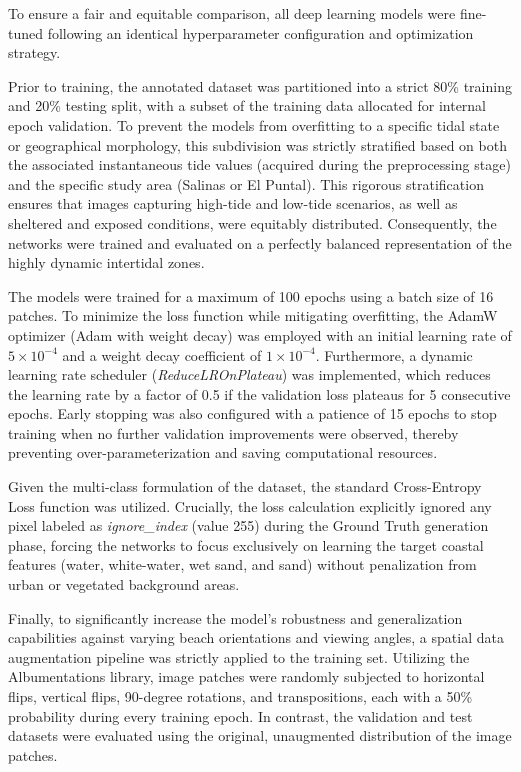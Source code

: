 ﻿\documentclass[ENG]{TFUOC}%
\begin{document}
To ensure a fair and equitable comparison, all deep learning models were fine-tuned following an identical hyperparameter configuration and optimization strategy. 

Prior to training, the annotated dataset was partitioned into a strict 80\% training and 20\% testing split, with a subset of the training data allocated for internal epoch validation. To prevent the models from overfitting to a specific tidal state or geographical morphology, this subdivision was strictly stratified based on both the associated instantaneous tide values (acquired during the preprocessing stage) and the specific study area (Salinas or El Puntal). This rigorous stratification ensures that images capturing high-tide and low-tide scenarios, as well as sheltered and exposed conditions, were equitably distributed. Consequently, the networks were trained and evaluated on a perfectly balanced representation of the highly dynamic intertidal zones.

The models were trained for a maximum of 100 epochs using a batch size of 16 patches. To minimize the loss function while mitigating overfitting, the AdamW optimizer (Adam with weight decay) was employed with an initial learning rate of $5 \times 10^{-4}$ and a weight decay coefficient of $1 \times 10^{-4}$. Furthermore, a dynamic learning rate scheduler (\textit{ReduceLROnPlateau}) was implemented, which reduces the learning rate by a factor of 0.5 if the validation loss plateaus for 5 consecutive epochs. Early stopping was also configured with a patience of 15 epochs to stop training when no further validation improvements were observed, thereby preventing over-parameterization and saving computational resources.

Given the multi-class formulation of the dataset, the standard Cross-Entropy Loss function was utilized. Crucially, the loss calculation explicitly ignored any pixel labeled as \textit{ignore\_index} (value 255) during the Ground Truth generation phase, forcing the networks to focus exclusively on learning the target coastal features (water, white-water, wet sand, and sand) without penalization from urban or vegetated background areas.

Finally, to significantly increase the model's robustness and generalization capabilities against varying beach orientations and viewing angles, a spatial data augmentation pipeline was strictly applied to the training set. Utilizing the Albumentations library, image patches were randomly subjected to horizontal flips, vertical flips, 90-degree rotations, and transpositions, each with a 50\% probability during every training epoch. In contrast, the validation and test datasets were evaluated using the original, unaugmented distribution of the image patches.
\end{document}

